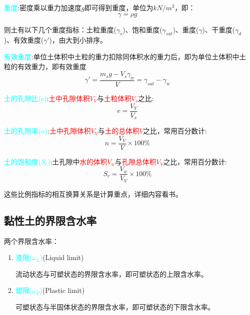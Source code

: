 \documentclass[12pt,a4paper]{ctexart}
\begin{document}
	\textcolor{cyan}{重度}:密度乘以重力加速度$g$即可得到重度，单位为$kN/m^3$，即：
			\begin{equation}
				\gamma=\rho g
			\end{equation}
		
	则土有以下几个重度指标：土粒重度($\gamma_s$)、饱和重度($\gamma_{sat}$)、重度($\gamma$)、干重度($\gamma_d$)、有效重度($\gamma'$)，由大到小排序。
	
	\textcolor{cyan}{有效重度}:单位土体积中土粒的重力扣除同体积水的重力后，即为单位土体积中土粒的有效重力，即有效重度
			\begin{equation}
				\gamma'=\frac{m_sg-V_s\gamma_w}{V}=\gamma_{sat}-\gamma_w
			\end{equation}
		
	\textcolor{cyan}{土的孔隙比($e$)}:\textcolor{red}{土中孔隙体积$V_V$}与\textcolor{red}{土粒体积$V_s$}之比:
			\begin{equation}
				e=\frac{V_V}{V_s}
			\end{equation}
			
	\textcolor{cyan}{土的孔隙率($n$)}:\textcolor{red}{土中孔隙体积$V_V$}与\textcolor{red}{土的总体积$V$}之比，常用百分数计:
			\begin{equation}
				n=\frac{V_V}{V}\times 100\%
			\end{equation}
		
	\textcolor{cyan}{土的饱和度($S_r$)}:土孔隙中\textcolor{red}{水的体积$V_w$}与\textcolor{red}{孔隙总体积$V_V$}之比，常用百分数计:
			\begin{equation}
				S_r=\frac{V_w}{V_V}\times 100\%
			\end{equation}
		
	这些比例指标的相互换算关系是计算重点，详细内容看书。
		
	\subsection{黏性土的界限含水率}
	两个界限含水率：
	\begin{enumerate}
		\item \textcolor{cyan}{液限($\omega_L$)}(Liquid limit)
		
		流动状态与可塑状态的界限含水率，即可塑状态的上限含水率。
		
		\item \textcolor{cyan}{塑限($\omega_P$)}(Plastic limit)
		
		可塑状态与半固体状态的界限含水率，即可塑状态的下限含水率。
	\end{enumerate}
\end{document}
